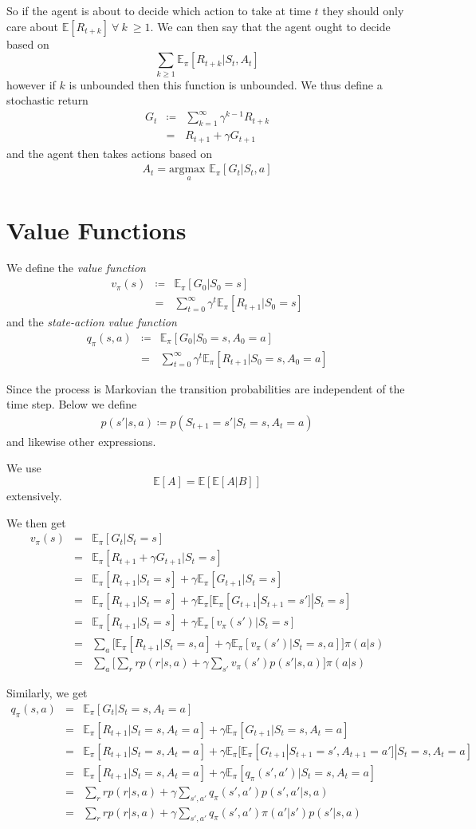 \documentclass[11pt,a4paper]{article}
\newcommand\be{\begin{equation}}
\newcommand\bea{\begin{eqnarray}}
\newcommand\ee{\end{equation}}
\newcommand\eea{\end{eqnarray}}
\newcommand{\nn}{\nonumber \\}
\newcommand{\e}[2]{\mathbb E_{#2}[#1]}
\newcommand{\argmax}[1]{\underset{#1}{\text{argmax }}}
\begin{document}
So if the agent is about to decide which action to take at time $t$ they should only care about $\mathbb E[R_{t+k}]~\forall~k\ \ge 1$. We can then say that the agent ought to decide based on
\be
\sum_{k \ge 1} \mathbb E_\pi[R_{t+k}|S_t,A_t]
\ee
however if $k$ is unbounded then this function is unbounded. We thus define a stochastic return 
\bea
G_t &\coloneqq& \sum_{k=1}^\infty \gamma^{k-1} R_{t+k} \label{def:G} \nn
&=& R_{t+1} + \gamma G_{t+1}
\eea
and the agent then takes actions based on
\bea
A _t= \argmax{a} \mathbb E_\pi[G_t|S_t,a]
\eea

\section{Value Functions}

We define the {\em value function}
\bea
v_\pi(s) &\coloneqq& \mathbb E_\pi[G_0|S_0=s] \nn
&=& \sum_{t=0}^\infty \gamma^t \mathbb E_\pi[R_{t+1} |S_0=s]
\eea
and the {\em state-action value function}
\bea
q_\pi(s,a) &\coloneqq& \mathbb E_\pi[G_0|S_0=s,A_0=a] \nn
&=& \sum_{t=0}^\infty \gamma^t \mathbb E_\pi[R_{t+1} |S_0=s,A_0=a]
\eea


Since the process is Markovian the transition probabilities are independent of the time step. Below we define
\bea
p(s'|s,a) \coloneqq p(S_{t+1}=s'|S_t=s,A_t=a)
\eea
and likewise other expressions.

We use
\be
\mathbb E[A] =\mathbb E[ \mathbb E[A|B] ]
\ee
extensively.

We then get
\bea
v_\pi(s) &=& \e{G_t|S_t=s}{\pi} \nn
&=& \e{R_{t+1} + \gamma G_{t+1} |S_t=s}{\pi} \nn
&=& \e{R_{t+1}|S_t=s}{\pi} + \gamma \e{G_{t+1}|S_t=s}{\pi} \nn
&=& \e{R_{t+1}|S_t=s}{\pi} + \gamma \e{\e{G_{t+1}|S_{t+1}=s'}{\pi}|S_t=s}{\pi}  \nn
&=& \e{R_{t+1}|S_t=s}{\pi} + \gamma \e{v_\pi(s') |S_t=s}{\pi} \nn
&=& \sum_a \Bigg[\e{R_{t+1}|S_t=s,a}{\pi} + \gamma \e{v_\pi(s') |S_t=s,a}{\pi} \Bigg] \pi(a|s) \nn
&=& \sum_a \Bigg[\sum_r r p(r|s,a) + \gamma \sum_{s'} v_\pi(s') p(s'|s,a) \Bigg] \pi(a|s) 
\eea



Similarly, we get
\bea
q_\pi(s,a) &=& \e{G_t | S_t=s,A_t=a}{\pi} \nn
&=& \e{R_{t+1} |S_t=s,A_t=a}{\pi} + \gamma \e{G_{t+1} | S_t=s, A_t=a}{\pi} \nn
&=& \e{R_{t+1} |S_t=s,A_t=a}{\pi} + \gamma \e{ \e{G_{t+1} | S_{t+1}=s',A_{t+1}=a'}{\pi}|S_t=s, A_t=a}{\pi} \nn
&=& \e{R_{t+1} |S_t=s,A_t=a}{\pi} + \gamma \e{ q_\pi(s',a')|S_t=s, A_t=a}{\pi} \nn
&=& \sum_r r p(r|s,a) + \gamma \sum_{s',a'} q_\pi(s',a') p(s',a'|s,a) \nn
&=&  \sum_r r p(r|s,a) + \gamma \sum_{s',a'} q_\pi(s',a') \pi(a'|s') p(s'|s,a)
\eea
\end{document}
